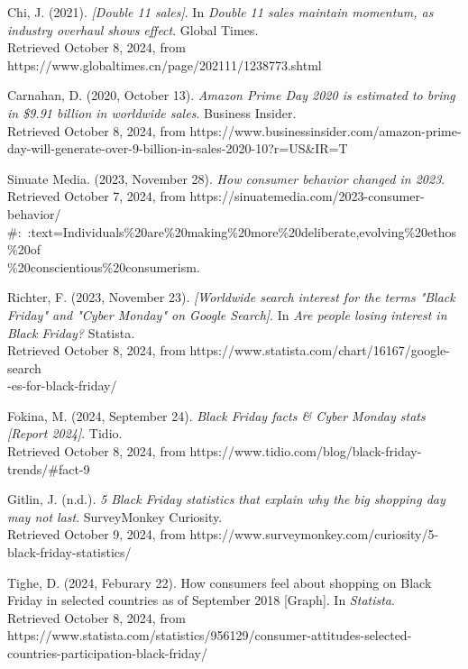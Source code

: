 \documentclass[12pt]{ctexart}
\begin{document}
\newpage
{}
\begin{thebibliography}{99}

     Chi, J. (2021). \textit{[Double 11 sales]}. In \textit{Double 11 sales maintain momentum, as industry overhaul shows effect}. Global Times. \\ Retrieved October 8, 2024, from https://www.globaltimes.cn/page/202111/1238773.shtml
    
     Carnahan, D. (2020, October 13). \textit{Amazon Prime Day 2020 is estimated to bring in \$9.91 billion in worldwide sales}. Business Insider. \\ Retrieved October 8, 2024, from https://www.businessinsider.com/amazon-prime-day-will-generate-over-9-billion-in-sales-2020-10?r=US\&IR=T

     Sinuate Media. (2023, November 28). \textit{How consumer behavior changed in 2023}. \\ Retrieved October 7, 2024, from https://sinuatemedia.com/2023-consumer-behavior/ \\     \#:~:text=Individuals\%20are\%20making\%20more\%20deliberate,evolving\%20ethos\%20of \\ \%20conscientious\%20consumerism. 

     Richter, F. (2023, November 23). \textit{[Worldwide search interest for the terms "Black Friday" and "Cyber Monday" on Google Search]}. In \textit{Are people losing interest in Black Friday?} Statista. \\ Retrieved October 8, 2024, from https://www.statista.com/chart/16167/google-search\\-es-for-black-friday/

     Fokina, M. (2024, September 24).  \textit{Black Friday facts \& Cyber Monday stats [Report 2024]}. Tidio.  \\ Retrieved October 8, 2024, from https://www.tidio.com/blog/black-friday-trends/\#fact-9

     Gitlin, J. (n.d.). \textit{5 Black Friday statistics that explain why the big shopping day may not last}. SurveyMonkey Curiosity. \\ Retrieved October 9, 2024, from https://www.surveymonkey.com/curiosity/5-black-friday-statistics/

     Tighe, D. (2024, Feburary 22). How consumers feel about shopping on Black Friday in selected countries as of September 2018 [Graph]. In \textit{Statista}. \\ Retrieved October 8, 2024, from https://www.statista.com/statistics/956129/consumer-attitudes-selected-countries-participation-black-friday/


\end{thebibliography}
\end{document}
